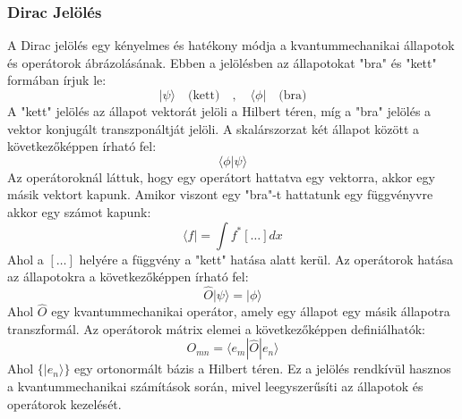 \documentclass[../main.tex]{subfiles}
\begin{document}
\subsubsection{Dirac Jelölés}
A Dirac jelölés egy kényelmes és hatékony módja a kvantummechanikai állapotok és operátorok ábrázolásának. Ebben a jelölésben az állapotokat "bra" és "kett" formában írjuk le:
\begin{equation}
    |\psi\rangle \quad \text{(kett)} \quad , \quad \langle \phi| \quad \text{(bra)}
\end{equation}
A "kett" jelölés az állapot vektorát jelöli a Hilbert téren, míg a "bra" jelölés a vektor konjugált transzponáltját jelöli. A skalárszorzat két állapot között a következőképpen írható fel:
\begin{equation}
    \langle \phi | \psi \rangle
\end{equation}
Az operátoroknál láttuk, hogy egy operátort hattatva egy vektorra, akkor egy másik vektort kapunk. Amikor viszont egy "bra"-t hattatunk egy függvényvre akkor egy számot kapunk:
\begin{equation}
    \langle f | = \int f^*\left[\ldots\right]dx
\end{equation}
Ahol a $\left[\ldots\right]$ helyére a függvény a "kett" hatása alatt kerül.  
Az operátorok hatása az állapotokra a következőképpen írható fel:
\begin{equation}
    \hat{O} |\psi\rangle = |\phi\rangle
\end{equation}
Ahol $\hat{O}$ egy kvantummechanikai operátor, amely egy állapot egy másik állapotra transzformál. Az operátorok mátrix elemei a következőképpen definiálhatók:
\begin{equation}
    O_{mn} = \langle e_m | \hat{O} | e_n \rangle
\end{equation}
Ahol $\{|e_n\rangle\}$ egy ortonormált bázis a Hilbert téren. Ez a jelölés rendkívül hasznos a kvantummechanikai számítások során, mivel leegyszerűsíti az állapotok és operátorok kezelését.
\end{document}

